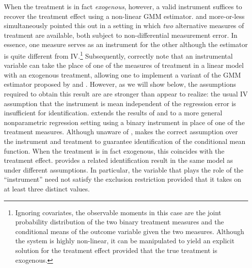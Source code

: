 When the treatment is in fact \emph{exogenous}, however, a valid instrument suffices to recover the treatment effect using a non-linear GMM estimator.
\cite{BBS} and \cite{KRS} more-or-less simultaneously pointed this out in a setting in which \emph{two} alternative measures of treatment are available, both subject to non-differential measurement error.
In essence, one measure serves as an instrument for the other although the estimator is quite different from IV.\footnote{Ignoring covariates, the observable moments in this case are the joint probability distribution of the two binary treatment measures and the conditional means of the outcome variable given the two measures. Although the system is highly non-linear, it can be manipulated to yield an explicit solution for the treatment effect provided that the true treatment is exogenous.}
Subsequently, \cite{FL} correctly note that an instrumental variable can take the place of one of the measures of treatment in a linear model with an exogenous treatment, allowing one to implement a variant of the GMM estimator proposed by \cite{BBS} and \cite{KRS}.
However, as we will show below, the assumptions required to obtain this result are are stronger than \cite{FL} appear to realize: the usual IV assumption that the instrument is mean independent of the regression error is insufficient for identification. 
\cite{Mahajan} extends the results of \cite{BBS} and \cite{KRS} to a more general nonparametric regression setting using a binary instrument in place of one of the treatment measures. 
Although unaware of \cite{FL}, \cite{Mahajan} makes the correct assumption over the instrument and treatment to guarantee identification of the conditional mean function.
When the treatment is in fact exogenous, this coincides with the treatment effect.
\cite{Lewbel} provides a related identification result in the same model as \cite{Mahajan} under different assumptions.
In particular, the variable that plays the role of the ``instrument'' need not satisfy the exclusion restriction provided that it takes on at least three distinct values. 



